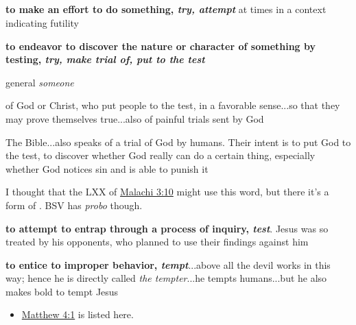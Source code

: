 			\subparagraph{\texorpdfstring{}{}}
				\label{PEIRAZO}
			
				\begin{compactdesc}
					\item[BDAG 704a] \textbf{}
						\begin{compactitem}
							\item[1] \textbf{to make an effort to do something, \textit{try, attempt}} at times in a context indicating futility
							\item[2] \textbf{to endeavor to discover the nature or character of something by testing, \textit{try, make trial of, put to the test}}
							\item[2.a] general  \textit{someone}
							\item[2.b] of God or Christ, who put people to the test, in a favorable sense...so that they may prove themselves true...also of painful trials sent by God
							\item[2.c] The Bible...also speaks of a trial of God by humans. Their intent is to put God to the test, to discover whether God really can do a certain thing, especially whether God notices sin and is able to punish it
								\begin{compactitem}
									\item I thought that the LXX of \hyperref[MALACHI-3-10]{Malachi 3:10} might use this word, but there it's a form of . BSV has \textit{probo} though.
								\end{compactitem}
							\item[3] \textbf{to attempt to entrap through a process of inquiry, \textit{test}}. Jesus was so treated by his opponents, who planned to use their findings against him
							\item[4] \textbf{to entice to improper behavior, \textit{tempt}}...above all the devil works in this way; hence he is directly called  \textit{the tempter}...he tempts humans...but he also makes bold to tempt Jesus
								\begin{itemize}
									\item \hyperref[MATTHEW-4-1]{Matthew 4:1} is listed here.
								\end{itemize}
						\end{compactitem}

\end{compactdesc}
